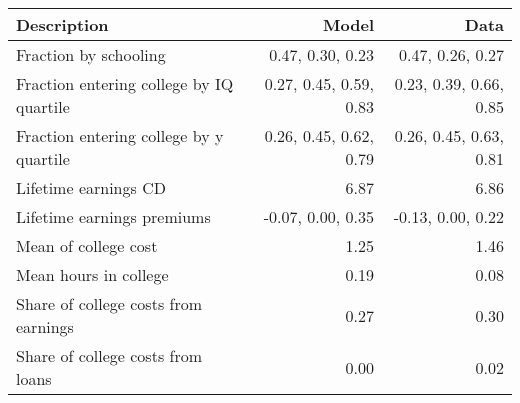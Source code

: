 \begin{tabular}{lrr}
\hline
Description & Model  & Data  \\ 
\hline
Fraction by schooling & 0.47, 0.30, 0.23  & 0.47, 0.26, 0.27  \\ 
Fraction entering college by IQ quartile & 0.27, 0.45, 0.59, 0.83  & 0.23, 0.39, 0.66, 0.85  \\ 
Fraction entering college by y quartile & 0.26, 0.45, 0.62, 0.79  & 0.26, 0.45, 0.63, 0.81  \\ 
Lifetime earnings CD & 6.87  & 6.86  \\ 
Lifetime earnings premiums & -0.07, 0.00, 0.35  & -0.13, 0.00, 0.22  \\ 
Mean of college cost & 1.25  & 1.46  \\ 
Mean hours in college & 0.19  & 0.08  \\ 
Share of college costs from earnings & 0.27  & 0.30  \\ 
Share of college costs from loans & 0.00  & 0.02  \\ 
\hline
\end{tabular}%
